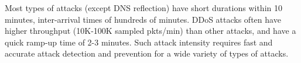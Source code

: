 \begin{encompact}
\item Most types of attacks (except DNS reflection) have short durations within 10 minutes, inter-arrival times of hundreds of minutes. DDoS attacks often have higher throughput (10K-100K sampled pkts/min) than other attacks, and have a quick ramp-up time of 2-3 minutes. Such attack intensity requires fast and accurate attack detection and prevention for a wide variety of types of attacks. 

%
%
%





\end{encompact}
